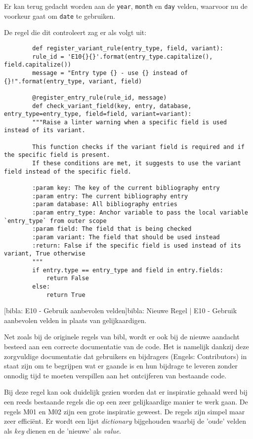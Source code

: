 Er kan terug gedacht worden aan de \texttt{year}, \texttt{month} en \texttt{day} velden, waarvoor nu de voorkeur gaat om \texttt{date} te gebruiken.

De regel die dit controleert zag er als volgt uit:

\begin{verbatim}
        def register_variant_rule(entry_type, field, variant):
        rule_id = 'E10{}{}'.format(entry_type.capitalize(), field.capitalize())
        message = "Entry type {} - use {} instead of {}!".format(entry_type, variant, field)
        
        @register_entry_rule(rule_id, message)
        def check_variant_field(key, entry, database, entry_type=entry_type, field=field, variant=variant):
        """Raise a linter warning when a specific field is used instead of its variant.
        
        This function checks if the variant field is required and if the specific field is present.
        If these conditions are met, it suggests to use the variant field instead of the specific field.
        
        :param key: The key of the current bibliography entry
        :param entry: The current bibliography entry
        :param database: All bibliography entries
        :param entry_type: Anchor variable to pass the local variable `entry_type` from outer scope
        :param field: The field that is being checked
        :param variant: The field that should be used instead
        :return: False if the specific field is used instead of its variant, True otherwise
        """
        if entry.type == entry_type and field in entry.fields:
            return False
        else:
            return True
\end{verbatim}
[bibla: E10 - Gebruik aanbevolen velden]{bibla: Nieuwe Regel | E10 - Gebruik aanbevolen velden in plaats van gelijkaardigen. \label{lst:bibla_NR_E10}}

Net zoals bij de originele regels van bibl, wordt er ook bij de nieuwe aandacht besteed aan een correcte documentatie van de code. Het is namelijk dankzij deze zorgvuldige documentatie dat gebruikers en bijdragers (Engels: Contributors) in staat zijn om te begrijpen wat er gaande is en hun bijdrage te leveren zonder onnodig tijd te moeten verspillen aan het ontcijferen van bestaande code.
    
Bij deze regel kan ook duidelijk gezien worden dat er inspiratie gehaald werd bij een reeds bestaande regels die op een zeer gelijkaardige manier te werk gaan. De regels M01 en M02 zijn een grote inspiratie geweest. De regels zijn simpel maar zeer efficiënt. Er wordt een lijst \emph{dictionary} bijgehouden waarbij de 'oude' velden als \emph{key} dienen en de 'nieuwe' als \emph{value}.

